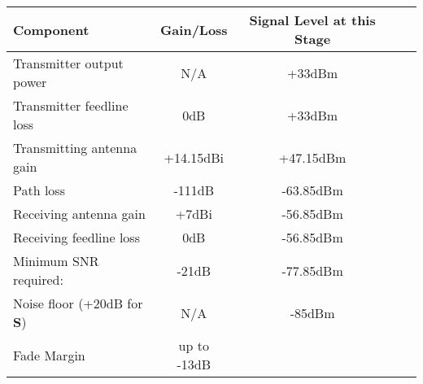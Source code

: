 \documentclass{article}
\begin{document}
\begin{table}[h]
\centering
    \begin{tabular}{lcccl}
				\toprule Component & Gain/Loss & Signal Level at this Stage \\
				\midrule
				Transmitter output power & N/A & +33dBm \\
				\midrule
				Transmitter feedline loss & 0dB & +33dBm \\
				\midrule
				Transmitting antenna gain & +14.15dBi & +47.15dBm \\
				\midrule
				Path loss & -111dB & -63.85dBm \\
				\midrule
				Receiving antenna gain & +7dBi & -56.85dBm \\
				\midrule
				Receiving feedline loss & 0dB & -56.85dBm \\
				\midrule
				Minimum SNR required: & -21dB & -77.85dBm \\
				\midrule
				Noise floor (+20dB for $\boldsymbol{S}$) & N/A & -85dBm \\
				\midrule
				Fade Margin & up to -13dB & \\
				\bottomrule
    \end{tabular}
\end{table}
\end{document}

